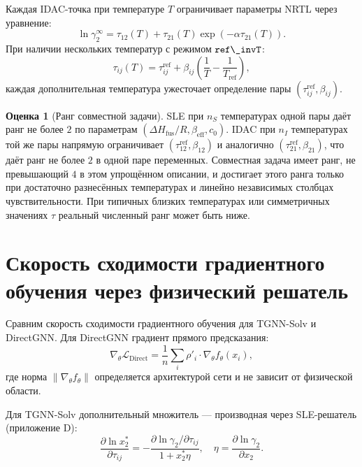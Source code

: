 \documentclass[11pt]{article}
\DeclareRobustCommand{\code}[1]{\texttt{\detokenize{#1}}}
\newcommand{\dHfus}{\Delta H_{\mathrm{fus}}}
\theoremstyle{definition}
\newtheorem{estimate}{Оценка}[section]
\begin{document}
Каждая IDAC-точка при температуре $T$ ограничивает параметры NRTL через уравнение:
\begin{equation*}
    \ln\gamma_2^\infty = \tau_{12}(T) + \tau_{21}(T) \exp(-\alpha \tau_{21}(T)).
\end{equation*}
При наличии нескольких температур с режимом $\code{ref\_invT}$:
\begin{equation}
    \tau_{ij}(T)=\tau_{ij}^{\mathrm{ref}}
    +\beta_{ij}\left(\frac{1}{T}-\frac{1}{T_{\mathrm{ref}}}\right),
\end{equation}
каждая дополнительная температура ужесточает определение пары $(\tau_{ij}^{\mathrm{ref}}, \beta_{ij})$.

\begin{estimate}[Ранг совместной задачи]
SLE при $n_S$ температурах одной пары даёт ранг не более $2$ по параметрам $(\dHfus/R, \beta_{\mathrm{eff}}, c_0)$. IDAC при $n_I$ температурах той же пары напрямую ограничивает $(\tau_{12}^{\mathrm{ref}}, \beta_{12})$ и аналогично $(\tau_{21}^{\mathrm{ref}}, \beta_{21})$, что даёт ранг не более $2$ в одной паре переменных. Совместная задача имеет ранг, не превышающий $4$ в этом упрощённом описании, и достигает этого ранга только при достаточно разнесённых температурах и линейно независимых столбцах чувствительности. При типичных близких температурах или симметричных значениях $\tau$ реальный численный ранг может быть ниже.
\end{estimate}

\section{Скорость сходимости градиентного обучения через физический решатель}
\label{app:convergence}

Сравним скорость сходимости градиентного обучения для TGNN-Solv и DirectGNN. Для DirectGNN градиент прямого предсказания:
\begin{equation}
    \nabla_\theta \mathcal L_{\mathrm{Direct}} = \frac{1}{n}\sum_i \rho'_i \cdot \nabla_\theta f_\theta(x_i),
\end{equation}
где норма $\|\nabla_\theta f_\theta\|$ определяется архитектурой сети и не зависит от физической области.

Для TGNN-Solv дополнительный множитель — производная через SLE-решатель (приложение D):
\begin{equation}
    \frac{\partial \ln x_2^*}{\partial \tau_{ij}} = -\frac{\partial \ln\gamma_2/\partial\tau_{ij}}{1 + x_2^* \eta},
    \quad
    \eta = \frac{\partial\ln\gamma_2}{\partial x_2}.
\end{equation}
\end{document}
